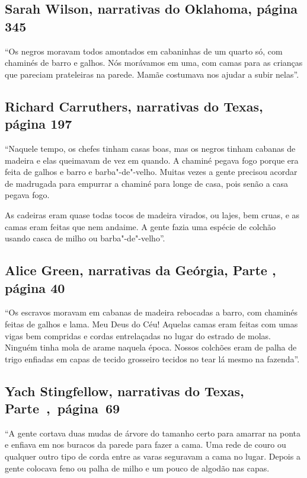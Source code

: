 \subsection{Sarah Wilson, narrativas do Oklahoma, página 345}
\label{ref300}

``Os negros moravam todos amontados em cabaninhas de um quarto só, com
chaminés de barro e galhos. Nós morávamos em uma, com camas para as
crianças que pareciam prateleiras na parede. Mamãe costumava nos ajudar
a subir nelas''.

\subsection{Richard Carruthers, narrativas do Texas, página 197} \label{ref49}

``Naquele tempo, os chefes tinham casas boas, mas os negros tinham
cabanas de madeira e elas queimavam de vez em quando. A chaminé pegava
fogo porque era feita de galhos e barro e barba"-de"-velho. Muitas vezes a
gente precisou acordar de madrugada para empurrar a chaminé para longe
de casa, pois senão a casa pegava fogo.

As cadeiras eram quase todas tocos de madeira virados, ou lajes, bem
cruas, e as camas eram feitas que nem andaime. A gente fazia uma espécie
de colchão usando casca de milho ou barba"-de"-velho''.

\subsection{Alice Green, narrativas da Geórgia, Parte , página 40}
\label{ref108}

``Os escravos moravam em cabanas de madeira rebocadas a barro, com
chaminés feitas de galhos e lama. Meu Deus do Céu! Aquelas camas eram
feitas com umas vigas bem compridas e cordas entrelaçadas no lugar do
estrado de molas. Ninguém tinha mola de arame naquela época. Nossos
colchões eram de palha de trigo enfiadas em capas de tecido grosseiro
tecidos no tear lá mesmo na fazenda''.

\subsection{Yach Stingfellow, narrativas do Texas, Parte~,~página~69}
\label{ref255} 

``A gente cortava duas mudas de árvore do tamanho certo para amarrar na
ponta e enfiava em nos buracos da parede para fazer a cama. Uma rede de %
couro ou qualquer outro tipo de corda entre as varas seguravam a cama no
lugar. Depois a gente colocava feno ou palha de milho e um pouco de
algodão nas capas.

